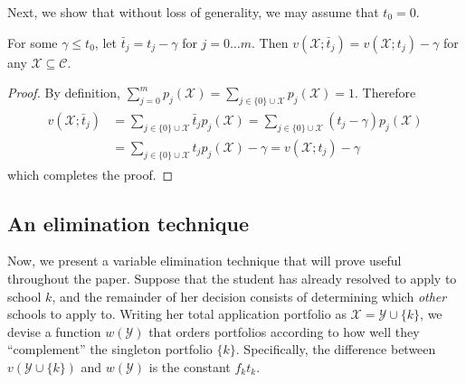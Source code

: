 Next, we show that without loss of generality, we may assume that $t_0 = 0$.

\begin{lemma} \label{assumetzerozero}
For some $\gamma \leq t_0$, let $\bar t_j = t_j - \gamma$ for $j = 0 \dots m$. Then $v(\mathcal{X}; \bar t_j) = v(\mathcal{X};  t_j) -  \gamma$ for any $\mathcal{X} \subseteq \mathcal{C}$. 
\end{lemma}
\begin{proof}
By definition, $\sum_{j=0}^m p_j(\mathcal{X}) = \sum_{j \in \{0\}\cup\mathcal{X}} p_j(\mathcal{X}) = 1$. Therefore
\begin{align*}
\begin{split}
v(\mathcal{X}; \bar t_j) &= \sum_{j\in \{0\}\cup\mathcal{X}}  \bar t_j p_j(\mathcal{X})
=\sum_{j\in \{0\}\cup\mathcal{X}} (t_j - \gamma) p_j(\mathcal{X}) \\
&=\sum_{j\in \{0\}\cup\mathcal{X}} t_j p_j(\mathcal{X})  - \gamma 
= v(\mathcal{X}; t_j) - \gamma
\end{split} 
\end{align*}
which completes the proof.
\end{proof}


\subsection{An elimination technique} \label{eliminationtechniquesection}

Now, we present a variable elimination technique that will prove useful throughout the paper. 
Suppose that the student has already resolved to apply to school $k$, and the remainder of her decision consists of determining which \emph{other} schools to apply to. Writing her total application portfolio as $\mathcal{X} = \mathcal{Y} \cup \{k\}$, we devise a function $w(\mathcal{Y})$ that orders portfolios according to how well they ``complement'' the singleton portfolio $\{k\}$. Specifically, the difference between $v(\mathcal{Y} \cup\{k\})$ and $w(\mathcal{Y})$ is the constant $f_k t_k$.

